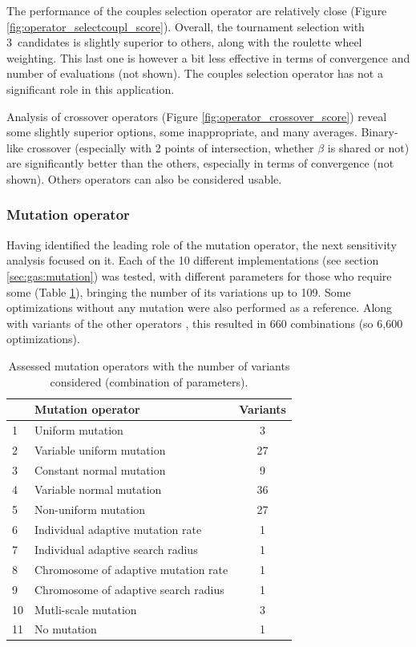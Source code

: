 \documentclass[twocol]{ametsoc}
\begin{document}
The performance of the couples selection operator are relatively close (Figure \ref{fig:operator_selectcoupl_score}). Overall, the tournament selection with 3~candidates is slightly superior to others, along with the roulette wheel weighting. This last one is however a bit less effective in terms of convergence and number of evaluations (not shown). The couples selection operator has not a significant role in this application. 

Analysis of crossover operators (Figure \ref{fig:operator_crossover_score}) reveal some slightly superior options, some inappropriate, and many averages. Binary-like crossover (especially with 2 points of intersection, whether $\beta$ is shared or not) are significantly better than the others, especially in terms of convergence (not shown). Others operators can also be considered usable.
	

\subsubsection{Mutation operator}
\label{sec:assessment:mutation}

Having identified the leading role of the mutation operator, the next sensitivity analysis focused on it. Each of the 10 different implementations (see section \ref{sec:gas:mutation}) was tested, with different parameters for those who require some (Table \ref{tab:assessed_mutation_operators}), bringing the number of its variations up to 109. Some optimizations without any mutation were also performed as a reference. Along with variants of the other operators \citep[see][for the details]{Horton2012a}, this resulted in 660 combinations (so 6,600 optimizations).

\begin{table}[htbp]
	\caption{Assessed mutation operators with the number of variants considered (combination of parameters).}
	\begin{center}
		\begin{tabular}{llc}
			\hline\hline  & \textbf{Mutation operator} & \textbf{Variants}\\ 
			\hline 
			1 & Uniform mutation & 3 \\
			2 & Variable uniform mutation & 27 \\
			3 & Constant normal mutation & 9 \\
			4 & Variable normal mutation & 36 \\
			5 & Non-uniform mutation & 27 \\
			6 & Individual adaptive mutation rate & 1 \\
			7 & Individual adaptive search radius & 1 \\
			8 & Chromosome of adaptive mutation rate & 1 \\
			9 & Chromosome of adaptive search radius & 1 \\
			10 & Mutli-scale mutation & 3 \\
			11 & No mutation & 1 \\
			\hline
		\end{tabular}
	\end{center}
	\label{tab:assessed_mutation_operators}
\end{table}
\end{document}
